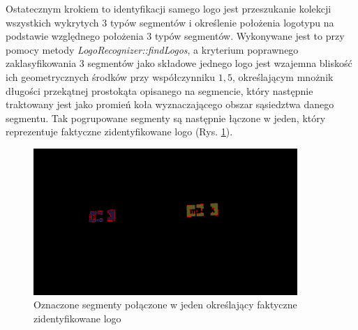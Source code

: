 Ostatecznym krokiem to identyfikacji samego logo jest przeszukanie kolekcji wszystkich wykrytych 3 typów segmentów i określenie położenia logotypu na podstawie względnego położenia 3 typów segmentów. Wykonywane jest to przy pomocy metody \textit{LogoRecognizer::findLogos}, a kryterium poprawnego zaklasyfikowania 3 segmentów jako składowe jednego logo jest wzajemna bliskość ich geometrycznych środków przy współczynniku $1,5$, określającym mnożnik długości przekątnej prostokąta opisanego na segmencie, który następnie traktowany jest jako promień koła wyznaczającego obszar sąsiedztwa danego segmentu. Tak pogrupowane segmenty są następnie łączone w jeden, który reprezentuje faktyczne zidentyfikowane logo (Rys. \ref{fig:segmenty_wszystkich_kolorow}).

\begin{figure}[H]
    \centering
    \includegraphics[width=10cm]{figures/img4_thresh_all_colored.png}
    \caption{Oznaczone segmenty połączone w jeden określający faktyczne zidentyfikowane logo}
    \label{fig:segmenty_wszystkich_kolorow}
\end{figure}

